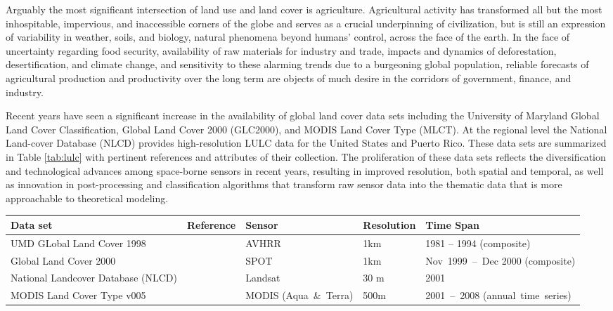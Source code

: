 Arguably the most significant intersection of land use and land cover
is agriculture.  Agricultural activity has transformed all but the
most inhospitable, impervious, and inaccessible corners of the globe
and serves as a crucial underpinning of civilization, but is still an
expression of variability in weather, soils, and biology, natural
phenomena beyond humans' control, across the face of the earth.  In
the face of uncertainty regarding food security, availability of raw
materials for industry and trade, impacts and dynamics of
deforestation, desertification, and climate change, and sensitivity to
these alarming trends due to a burgeoning global population, reliable
forecasts of agricultural production and productivity over the long
term are objects of much desire in the corridors of government,
finance, and industry.

Recent years have seen a significant increase in the availability of
global land cover data sets including the University of Maryland
Global Land Cover Classification, Global Land Cover 2000 (GLC2000),
and MODIS Land Cover Type (MLCT).  At the regional level the National
Land-cover Database (NLCD) provides high-resolution LULC data for the United States and Puerto Rico.  These data sets are
summarized in Table \ref{tab:lulc} with pertinent references and
attributes of their collection.  The proliferation of these data sets
reflects the diversification and technological advances among
space-borne sensors in recent years, resulting in improved resolution,
both spatial and temporal, as well as innovation in post-processing
and classification algorithms that transform raw sensor data into the
thematic data that is more approachable to theoretical modeling.

\begin{sidewaystable}
      \begin{tabular}{lp{2in}p{0.75in}lp{1.5in}}
        \hline
        Data set & Reference & Sensor & Resolution & Time Span \\
        \hline
        UMD GLobal Land Cover 1998 & \citet{Hansen2000} & AVHRR & 1km & 1981 -- 1994 (composite) \\
        Global Land Cover 2000 & \citet{EC2003,Bartholome2005} & SPOT & 1km & Nov~1999~--~Dec 2000 (composite) \\
        National Landcover Database (NLCD) & \citet{Homer2004,Homer2007} & Landsat & 30 m & 2001 \\
        MODIS Land Cover Type v005 & \citet{MLCT,Friedl2010} & MODIS (Aqua~\&~Terra) & 500m & 2001~--~2008 (annual~time~series) \\
        \hline
      \end{tabular}
    \caption{Summary of global LULC data sets}
    \label{tab:lulc}
\end{sidewaystable}

